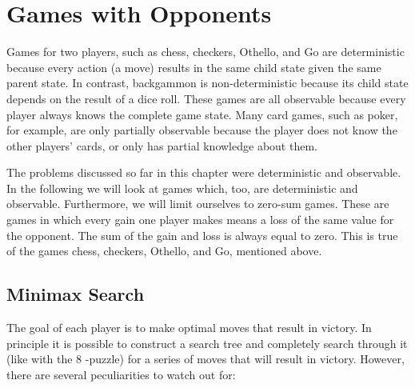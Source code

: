 \documentclass[10pt]{book}
\begin{document}
\section{Games with Opponents}
Games for two players, such as chess, checkers, Othello, and Go are deterministic because every action (a move) results in the same child state given the same parent state. In contrast, backgammon is non-deterministic because its child state depends on the result of a dice roll. These games are all observable because every player always knows the complete game state. Many card games, such as poker, for example, are only partially observable because the player does not know the other players' cards, or only has partial knowledge about them.


The problems discussed so far in this chapter were deterministic and observable. In the following we will look at games which, too, are deterministic and observable. Furthermore, we will limit ourselves to zero-sum games. These are games in which every gain one player makes means a loss of the same value for the opponent. The sum of the gain and loss is always equal to zero. This is true of the games chess, checkers, Othello, and Go, mentioned above.

\subsection{Minimax Search}
The goal of each player is to make optimal moves that result in victory. In principle it is possible to construct a search tree and completely search through it (like with the 8 -puzzle) for a series of moves that will result in victory. However, there are several peculiarities to watch out for:
\end{document}

